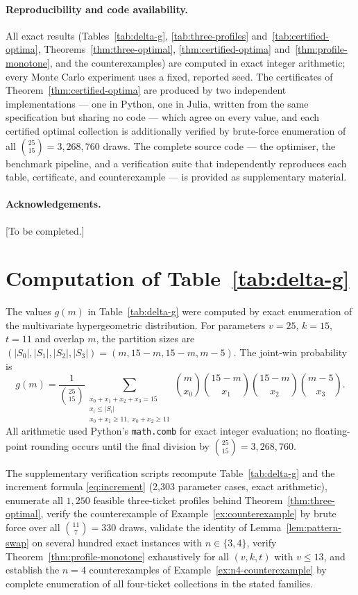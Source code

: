 \paragraph*{Reproducibility and code availability.}
All exact results (Tables~\ref{tab:delta-g}, \ref{tab:three-profiles}
and~\ref{tab:certified-optima}, Theorems~\ref{thm:three-optimal},
\ref{thm:certified-optima} and~\ref{thm:profile-monotone}, and the
counterexamples) are computed in exact integer arithmetic; every Monte
Carlo experiment uses a fixed, reported seed.  The certificates of
Theorem~\ref{thm:certified-optima} are produced by two independent
implementations --- one in Python, one in Julia, written from the same
specification but sharing no code --- which agree on every value, and
each certified optimal collection is additionally verified by brute-force
enumeration of all $\binom{25}{15} = 3{,}268{,}760$ draws.  The complete
source code --- the optimiser, the benchmark pipeline, and a verification
suite that independently reproduces each table, certificate, and
counterexample --- is provided as supplementary material.

\paragraph*{Acknowledgements.}  [To be completed.]

\appendix
\section{Computation of Table~\ref{tab:delta-g}}
\label{sec:appendix-computation}

The values $g(m)$ in Table~\ref{tab:delta-g} were computed by exact
enumeration of the multivariate hypergeometric distribution.  For parameters
$v=25$, $k=15$, $t=11$ and overlap $m$, the partition sizes are
$(|S_0|,|S_1|,|S_2|,|S_3|) = (m, 15{-}m, 15{-}m, m{-}5)$.  The joint-win
probability is
\[
  g(m) = \frac{1}{\binom{25}{15}}
  \sum_{\substack{x_0+x_1+x_2+x_3=15 \\
        x_i \le |S_i| \\
        x_0+x_1 \ge 11,\; x_0+x_2 \ge 11}}
  \binom{m}{x_0}\binom{15{-}m}{x_1}\binom{15{-}m}{x_2}\binom{m{-}5}{x_3}.
\]
All arithmetic used Python's \texttt{math.comb} for exact integer
evaluation; no floating-point rounding occurs until the final division
by $\binom{25}{15} = 3{,}268{,}760$.

The supplementary verification scripts recompute Table~\ref{tab:delta-g}
and the increment formula \eqref{eq:increment} (2{,}303 parameter cases,
exact arithmetic), enumerate all $1{,}250$ feasible three-ticket profiles
behind Theorem~\ref{thm:three-optimal}, verify the counterexample of
Example~\ref{ex:counterexample} by brute force over all
$\binom{11}{7} = 330$ draws, validate the identity of
Lemma~\ref{lem:pattern-swap} on several hundred exact instances with
$n \in \{3,4\}$, verify Theorem~\ref{thm:profile-monotone} exhaustively
for all $(v,k,t)$ with $v \le 13$, and establish the $n=4$
counterexamples of Example~\ref{ex:n4-counterexample} by complete
enumeration of all four-ticket collections in the stated families.

